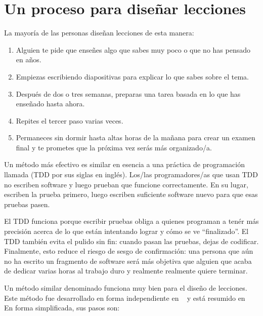 \chapter{Un proceso para diseñar lecciones}\label{s:process}

La mayoría de las personas diseñan lecciones de esta manera:
\begin{enumerate}

 \item
Alguien te pide que enseñes algo que sabes muy poco o que no has pensado en años.

 \item
Empiezas escribiendo diapositivas para explicar lo que sabes sobre el tema.

 \item
Después de dos o tres semanas,
preparas una tarea basada en lo que has enseñado hasta ahora.
 \item
Repites el tercer paso varias veces.
 \item
Permaneces sin dormir hasta altas horas de la mañana
para crear un examen final
y te prometes que la próxima vez serás más organizado/a.
\end{enumerate}

Un método más efectivo es similar en esencia a una práctica de programación llamada (TDD por sus siglas en inglés).
Los/las programadores/as que usan TDD no escriben software
y luego prueban que funcione correctamente.
En su lugar,
escriben la prueba primero,
luego escriben suficiente software nuevo para que esas pruebas pasen.
 
El TDD funciona porque escribir pruebas obliga a quienes programan a
tenér más precisión acerca de lo que están intentando lograr y cómo se ve ``finalizado''.
El TDD también evita el pulido sin fin:
cuando pasan las pruebas, dejas de codificar.
Finalmente,
esto reduce el riesgo de sesgo de confirmación:
una persona que aún no ha escrito un fragmento de software
será más objetiva que alguien que acaba de dedicar varias horas al trabajo duro y realmente realmente quiere terminar.
 
Un método similar denominado  funciona muy bien para el diseño de lecciones.
Este método fue desarrollado en forma independiente en ~\cite{Wigg2005,Bigg2011,Fink2013} y está resumido en~\cite{McTi2013}
En forma simplificada, sus pasos son:
 
